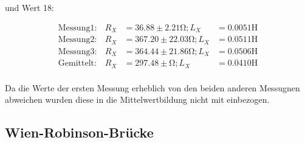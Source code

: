 und Wert 18:

\begin{align*}
\text{Messung}1:& R_X &= 36.88  \pm 2.21  \si{\ohm}; L_X &=  0.0051 \si{\henry}\\
\text{Messung}2:& R_X &= 367.20 \pm 22.03 \si{\ohm}; L_X &=  0.0511 \si{\henry}\\
\text{Messung}3:& R_X &= 364.44 \pm 21.86 \si{\ohm}; L_X &=  0.0506 \si{\henry}\\
\text{Gemittelt}:& R_X&= 297.48 \pm \si{\ohm}; L_X &=  0.0410 \si{\henry}\\
\end{align*}

Da die Werte der ersten Messung erheblich von den beiden anderen Messugnen abweichen wurden diese in die Mittelwertbildung nicht mit einbezogen.


\subsection{Wien-Robinson-Brücke}







